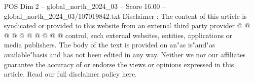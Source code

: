 \begin{textsample}{POS Dim 2 – global\_north\_2024\_03 – Score 16.00 – global\_north\_2024\_03/107019842.txt}
Disclaimer : The content of this article is syndicated or provided to this website from an external third party provider @ @ @ @ @ @ @ @ @ @ control, such external websites, entities, applications or media publishers.
The body of the text is provided on an"as is"and"as available"basis and has not been edited in any way.
Neither we nor our affiliates guarantee the accuracy of or endorse the views or opinions expressed in this article.
Read our full disclaimer policy here.

\end{textsample}
